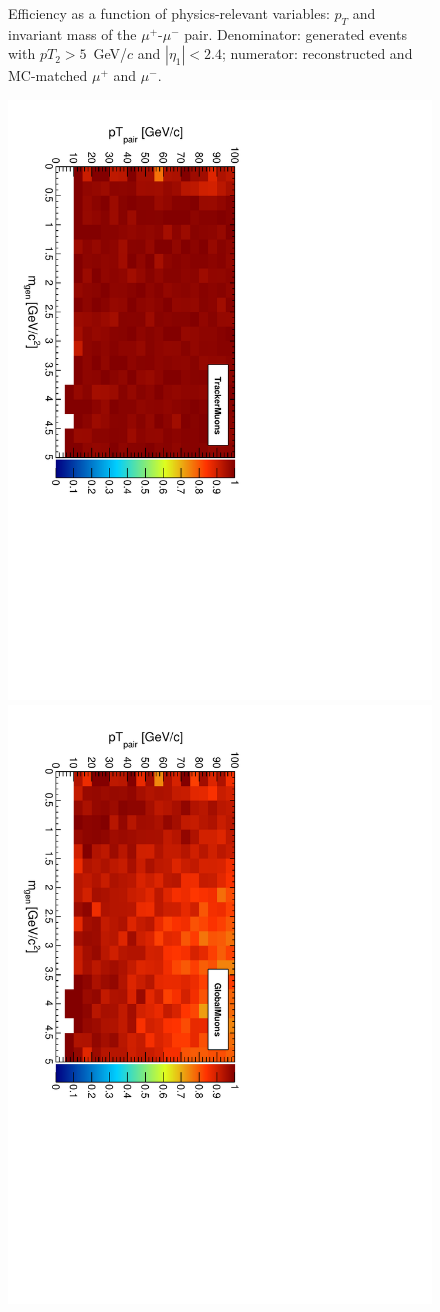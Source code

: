 \documentclass[12pt]{article}
\begin{document}
\begin{figure}[p]
\caption{Efficiency as a function of physics-relevant variables: $p_T$
  and invariant mass of the $\mu^+$-$\mu^-$ pair.  Denominator:
  generated events with $pT_2 > 5$~GeV/$c$ and $|\eta_1| < 2.4$;
  numerator: reconstructed and MC-matched $\mu^+$ and
  $\mu^-$. \label{fig:pairptvsmass}}
\end{figure}

\begin{figure}[p]
\includegraphics[height=0.5\linewidth, angle=90]{fig/acceptanceNoMCMatch_plot/pairptvsmass_TrackerMuons.pdf}
\includegraphics[height=0.5\linewidth, angle=90]{fig/acceptanceNoMCMatch_plot/pairptvsmass_GlobalMuons.pdf}


\end{figure}
\end{document}
